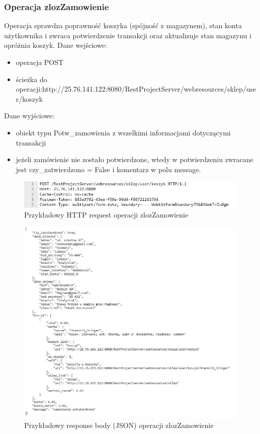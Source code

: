 \documentclass[11pt]{article}   %
\begin{document}
\subsubsection{Operacja zlozZamowienie}
Operacja sprawdza poprawność koszyka (spójność z magazynem), stan konta użytkownika i zwraca potwierdzenie transakcji oraz aktualizuje stan magazynu i opróżnia koszyk.\newline
Dane wejściowe:
\begin{itemize}
	\item operacja POST
	\item ścieżka do operacji:\newline http://25.76.141.122:8080/RestProjectServer/webresources/sklep/user/koszyk
	
\end{itemize}	
Dane wyjściowe:
\begin{itemize}
	\item obiekt typu Potw\_zamowienia z wszelkimi informacjami dotyczącymi transakcji
	\item jeżeli zamówienie nie zostało potwierdzone, wtedy w potwierdzeniu zwracane jest czy\_zatwierdzono = False i komentarz w polu message.
\end{itemize}
\begin{figure}[H]
	\centering
	\includegraphics[width=0.8\linewidth]{komunikaty_zdjecia_rest/zlozZamowienie_req}
	\caption{Przykładowy HTTP request operacji zlozZamowienie}
	\label{zrzut81}
\end{figure}
\begin{figure}[H]
	\centering
	\includegraphics[width=0.8\linewidth]{komunikaty_zdjecia_rest/zlozZamowienie_res_body}
	\caption{Przykładowy response body (JSON) operacji zlozZamowienie}
	\label{zrzut82}
\end{figure}
\end{document}
